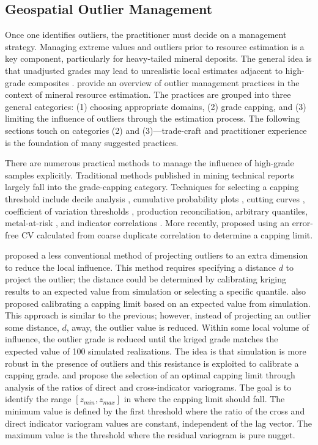 \subsection{Geospatial Outlier Management}
\label{subsec:01outliermanage}

Once one identifies outliers, the practitioner must decide on a management strategy. Managing extreme values and outliers prior to resource estimation is a key component, particularly for heavy-tailed mineral deposits. The general idea is that unadjusted grades may lead to unrealistic local estimates adjacent to high-grade composites \citep{nowak2013suggestions}. \cite{leuangthong2015dealing} provide an overview of outlier management practices in the context of mineral resource estimation. The practices are grouped into three general categories: (1) choosing appropriate domains, (2) grade capping, and (3) limiting the influence of outliers through the estimation process. The following sections touch on categories (2) and (3)—trade-craft and practitioner experience is the foundation of many suggested practices.

There are numerous practical methods to manage the influence of high-grade samples explicitly. Traditional methods published in mining technical reports largely fall into the grade-capping category. Techniques for selecting a capping threshold include decile analysis \citep{parrish1997geologist}, cumulative probability plots \citep{rossi2013mineral}, cutting curves \citep{roscoe1996cutting}, coefficient of variation thresholds \citep{parker1991statistical}, production reconciliation, arbitrary quantiles, metal-at-risk \citep{parker2006}, and indicator correlations \citep{nowak2019optimal}. More recently, \cite{dutaut2021new} proposed using an error-free \gls{CV} calculated from coarse duplicate correlation to determine a capping limit.

\cite{babakhani2014geostatistical} proposed a less conventional method of projecting outliers to an extra dimension to reduce the local influence. This method requires specifying a distance $d$ to project the outlier; the distance could be determined by calibrating kriging results to an expected value from simulation or selecting a specific quantile. \cite{babakhani2014geostatistical} also proposed calibrating a capping limit based on an expected value from simulation. This approach is similar to the previous; however, instead of projecting an outlier some distance, $d$, away, the outlier value is reduced. Within some local volume of influence, the outlier grade is reduced until the kriged grade matches the expected value of 100 simulated realizations. The idea is that simulation is more robust in the presence of outliers and this resistance is exploited to calibrate a capping grade. \cite{rivoirard2013topcut} and \cite{maleki2014capping} propose the selection of an optimal capping limit through analysis of the ratios of direct and cross-indicator variograms. The goal is to identify the range $[z_{min}, z_{max}]$ in where the capping limit should fall. The minimum value is defined by the first threshold where the ratio of the cross and direct indicator variogram values are constant, independent of the lag vector. The maximum value is the threshold where the residual variogram is pure nugget.

